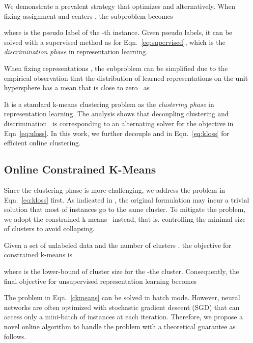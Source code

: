 \documentclass[10pt,twocolumn,letterpaper]{article}
\begin{document}
We demonstrate a prevalent strategy that optimizes  and  alternatively. When fixing assignment  and centers , the subproblem becomes

where  is the pseudo label of the -th instance. Given pseudo labels, it can be solved with a supervised method as for Eqn.~\ref{eq:supervised}, which is the \textit{discrimination phase} in representation learning.

When fixing representations , the subproblem can be simplified due to the empirical observation that the distribution of learned representations on the unit hypersphere has a mean that is close to zero~\cite{0001I20} as


It is a standard k-means clustering problem as the \textit{clustering phase} in representation learning. The analysis shows that decoupling clustering and discrimination~\cite{CaronBJD18, CaronMMGBJ20} is corresponding to an alternating solver for the objective in Eqn~\ref{eq:uloss}. In this work, we further decouple  and  in Eqn.~\ref{eq:kloss} for efficient online clustering.

\subsection{Online Constrained K-Means}
Since the clustering phase is more challenging, we address the problem in Eqn.~\ref{eq:kloss} first. As indicated in \cite{AsanoRV20a}, the original formulation may incur a trivial solution that most of instances go to the same cluster. To mitigate the problem, we adopt the constrained k-means~\cite{bradley2000constrained} instead, that is, controlling the minimal size of clusters to avoid collapsing.

Given a set of  unlabeled data  and the number of clusters , the objective for constrained k-means is
\begin{footnotesize}

\end{footnotesize}
where  is the lower-bound of cluster size for the -the cluster. Consequently, the final objective for unsupervised representation learning becomes
\begin{scriptsize}

\end{scriptsize}

The problem in Eqn.~\ref{ckmeans} can be solved in batch mode. However, neural networks are often optimized with stochastic gradient descent (SGD) that can access only a mini-batch of instances at each iteration. Therefore, we propose a novel online algorithm to handle the problem with a theoretical guarantee as follows. 
\end{document}
